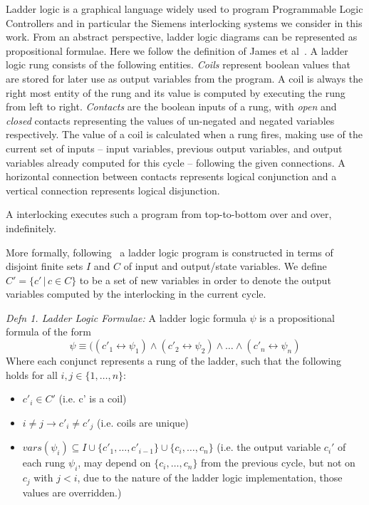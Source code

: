 \documentclass[conference,compsoc]{IEEEtran}
\begin{document}
Ladder logic is a graphical language widely used to program Programmable Logic Controllers\cite{IECstandard} and in particular the Siemens interlocking systems we consider in this work. From an abstract perspective, ladder logic diagrams can be represented as
propositional formulae. Here we follow the definition of James et al~\cite{sefm14}. A ladder logic rung consists of the following entities.
\emph{Coils}
represent boolean values that are stored for later use as output
variables from the program. A coil is always the right most entity
of the rung and its value is computed by executing the rung from left
to right.
\emph{Contacts} are the boolean inputs of a rung,
with \emph{open} and \emph{closed} contacts representing the values
of un-negated and negated variables respectively.  The value of a coil
is calculated when a rung fires, making use of the current set of
inputs -- input variables, previous output variables,
and output variables already computed for this cycle --
following the given connections.  A horizontal connection between
contacts represents logical conjunction and a vertical connection
represents logical disjunction.

A interlocking executes such a program from top-to-bottom over and over, indefinitely.

More formally, following~\cite{sefm14} a ladder logic program is constructed in terms of disjoint finite sets
$I$ and $C$ of input and output/state variables. We define $C' = \{ c' \, | \, c \in C \}$ to be a set of new variables
in order to denote the output variables computed by the interlocking in the current
cycle.

\textit{Defn 1. Ladder Logic Formulae:}
A ladder logic formula $\psi$ is a propositional formula of the form
$$\psi \equiv ((c'_1 \leftrightarrow \psi_1) \wedge (c'_2 \leftrightarrow
\psi_2) \wedge  \ldots \wedge (c'_n \leftrightarrow \psi_n)$$ 
Where each conjunct represents a rung of the ladder,
such that the following holds for all $i,j\in \{1,\ldots,n\}$:
\begin{itemize}
\item $c'_i \in C'$ (i.e. c' is a coil)
\item $i \neq j \rightarrow c'_i \neq c'_j$ (i.e. coils are unique)
\item $vars(\psi_i) \subseteq I \cup  \{c'_1, \ldots, c'_{i-1} \} \cup \{ c_i, \ldots , c_n \}$ (i.e. the output variable $c_i'$ of  each rung $\psi_i$, may depend on  $\{ c_i, \ldots , c_n \}$ from the previous cycle, 
but not on $c_j$ with $j<i$, due to the nature of the ladder logic implementation,
those values are overridden.)
\end{itemize}
\end{document}
